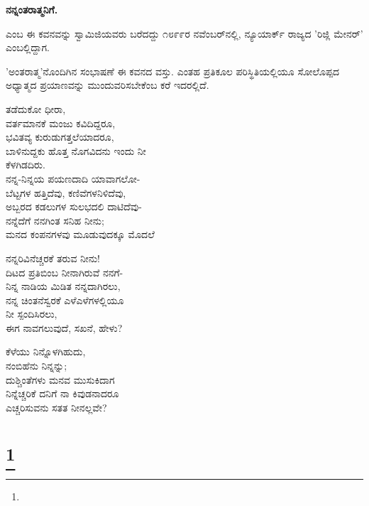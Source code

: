 \begin{center}
\textbf{ನನ್ನಂತರಾತ್ಮನಿಗೆ.}
\end{center}

 ಎಂಬ ಈ ಕವನವನ್ನು ಸ್ವಾಮಿಜಿಯವರು ಬರೆದದ್ದು ೧೮೯೯ರ ನವೆಂಬರ್‌ನಲ್ಲಿ, ನ್ಯೂಯಾರ್ಕ್ ರಾಜ್ಯದ 'ರಿಜ್ಲಿ ಮೇನರ್' ಎಂಬಲ್ಲಿದ್ದಾಗ.

'ಅಂತರಾತ್ಮ'ನೊಂದಿಗಿನ ಸಂಭಾಷಣೆ ಈ ಕವನದ ವಸ್ತು. ಎಂತಹ ಪ್ರತಿಕೂಲ ಪರಿಸ್ಥಿತಿಯಲ್ಲಿಯೂ ಸೋಲೊಪ್ಪದ ಅಧ್ಯಾತ್ಮದ ಪ್ರಯಾಣವನ್ನು ಮುಂದುವರಿಸಬೇಕೆಂಬ ಕರೆ ಇದರಲ್ಲಿದೆ.

\begin{myquote}
ತಡೆದುಕೋ ಧೀರಾ,\\ವರ್ತಮಾನಕೆ ಮಂಜು ಕವಿದಿದ್ದರೂ,\\ಭವಿತವ್ಯ ಕುರುಡುಗತ್ತಲೆಯಾದರೂ,\\ಬಾಳಿನುದ್ದಕು ಹೊತ್ತ ನೊಗವಿದನು ಇಂದು ನೀ\\ಕೆಳಗಿಡದಿರು.\\ನನ್ನ-ನಿನ್ನಯ ಪಯಣದಾದಿ ಯಾವಾಗಲೋ-\\ಬೆಟ್ಟಗಳ ಹತ್ತಿದೆವು, ಕಣಿವೆಗಳನಿಳಿದೆವು,\\ಅಬ್ಬರದ ಕಡಲುಗಳ ಸುಲಭದಲಿ ದಾಟಿದೆವು-\\ನನ್ನೆದೆಗೆ ನನಗಿಂತ ಸನಿಹ ನೀನು;\\ಮನದ ಕಂಪನಗಳವು ಮೂಡುವುದಕ್ಕೂ ಮೊದಲೆ
\end{myquote}

\begin{myquote}
ನನ್ನರಿವಿನೆಚ್ಚರಕೆ ತರುವ ನೀನು!\\ದಿಟದ ಪ್ರತಿಬಿಂಬ ನೀನಾಗಿರುವೆ ನನಗೆ-\\ನಿನ್ನ ನಾಡಿಯ ಮಿಡಿತ ನನ್ನದಾಗಿರಲು,\\ನನ್ನ ಚಿಂತನೆಸ್ವರಕೆ ಎಳೆಎಳೆಗಳಲ್ಲಿಯೂ\\ನೀ ಸ್ಪಂದಿಸಿರಲು,\\ಈಗ ನಾವಗಲುವುದೆ, ಸಖನೆ, ಹೇಳು?
\end{myquote}

\begin{myquote}
ಕೆಳೆಯು ನಿನ್ನೊಳಗಿಹುದು,\\ನಂಬಿಹೆನು ನಿನ್ನನ್ನು;\\ದುಶ್ಚಿಂತೆಗಳು ಮನವ ಮುಸುಕಿದಾಗ\\ನಿನ್ನೆಚ್ಚರಿಕೆ ದನಿಗೆ ನಾ ಕಿವುಡನಾದರೂ\\ಎಚ್ಚರಿಸುವನು ಸತತ ನೀನಲ್ಲವೇ?
\end{myquote}

\selecteng

\chapter[NO ONE TO BLAME]{\protect\footnote{}}

